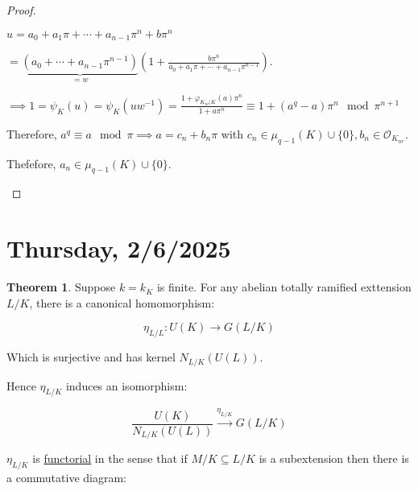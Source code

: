 \documentclass{article}
\theoremstyle{definition}
\newtheorem{theorem}{Theorem}
\numberwithin{theorem}{subsection}
\begin{document}
\begin{proof}
\begin{enumerate}[label=\roman*)]
            \(u = a_0 + a_1 \pi + \cdots + a_{n-1} \pi^n + b \pi^n\)
            
            \(=\underbrace{(a_0 + \cdots + a_{n-1} \pi^{n-1})}_{=w} \left( 1 + \frac{b \pi^n}{a_0 + a_1 \pi + \cdots + a_{n-1} \pi^{n-1}}\right)\).
            
            \(\implies 1 = \psi_K (u) = \psi_K(u w ^{-1}) = \frac{1 + \varphi_{K_{nr} | K}(a) \pi^n}{1 + a \pi^n} \equiv 1 + (a^q - a) \pi^n \mod \pi^{n+1}\)
            
            Therefore, \(a^q \equiv a \mod \pi \implies a = c_n + b_n \pi\) with \(c_n \in \mu_{q-1}(K)\cup \{ 0 \}, b_n \in \mathcal{O}_{K_{nr}}\).
            
            Thefefore, \(a_n \in \mu_{q-1}(K) \cup \{ 0 \}\).

            
        \end{enumerate} 
    \end{proof}

    \section*{Thursday, 2/6/2025}
    
    \begin{theorem}
        Suppose \(k = k_K\) is finite. For any abelian totally ramified exttension \(L / K\), there is a canonical homomorphism:

        \[
            \eta_{L / L} : U(K) \to G(L / K)
        \]

        Which is surjective and has kernel \(N_{L / K}(U(L))\).

        Hence \(\eta_{L / K}\) induces an isomorphism:

        \[
            \frac{U(K)}{N_{L / K}(U(L))} \xrightarrow{\eta_{L / K}} G(L / K)
        \]

        \(\eta_{L / K}\) is \underline{functorial} in the sense that if \(M / K \subseteq L / K\) is a subextension then there is a commutative diagram:

        \begin{center}
        \end{center}
    \end{theorem}
\end{document}
